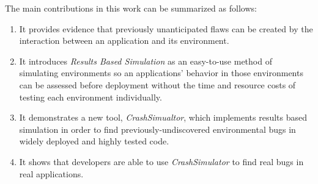 The main contributions in this work can be summarized as follows:

\begin{enumerate}

\item{It provides evidence
that previously unanticipated flaws can be created by the interaction
between an application and its environment.}

\item{It introduces \textit{Results Based Simulation}
as an easy-to-use method of simulating environments
so an applications' behavior in those environments
can be assessed before deployment
without the time and resource costs of
testing each environment individually.}

\item{It demonstrates a new tool, {\em CrashSimualtor},
which implements results based simulation
in order to find previously-undiscovered environmental bugs
in widely deployed and highly tested code.}

\item{It shows that developers are able
to use {\em CrashSimulator}
to find real bugs in real applications.}

\end{enumerate}
